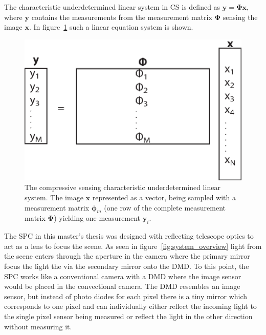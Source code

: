 The characteristic  underdetermined linear system in CS is defined as $ \mathbf{y} = \mathbf{\Phi}\mathbf{x}$, where $\mathbf{y}$ contains the measurements from the measurement matrix $\mathbf{\Phi}$ sensing the image $\mathbf{x}$. In figure~\ref{fig:CS_eq_sys} such a linear equation system is shown.

\begin{figure}[H]
	\includegraphics[scale=0.5]{gfx/CS_eq.eps}
	\caption{The compressive sensing characteristic underdetermined linear system. The image $\mathbf{x}$ represented as a vector, being sampled with a measurement matrix $\mathbf{\phi}_m$ (one row of the complete measurement matrix $\mathbf{\Phi}$) yielding one measurement $\mathbf{y}_i$.}
	\label{fig:CS_eq_sys}
\end{figure}

The SPC in this master's thesis was designed with reflecting telescope optics to act as a lens to focus the scene. As seen in figure~\ref{fig:system_overview} light from the scene enters through the aperture in the camera where the primary mirror focus the light the via the secondary mirror onto the DMD. To this point, the SPC works like a conventional camera with a DMD where the image sensor would be placed in the convectional camera. The DMD resembles an image sensor, but instead of photo diodes for each pixel there is a tiny mirror which corresponds to one pixel and can individually either reflect the incoming light to the single pixel sensor being measured or reflect the light in the other direction without measuring it.




